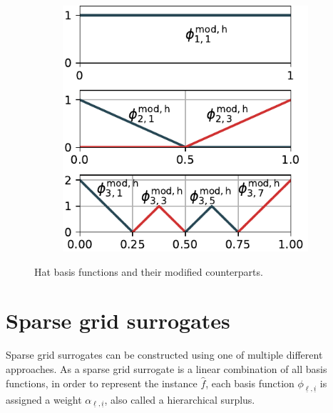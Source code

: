 \documentclass[
  a4paper,  %
  twoside,  %
  bibliography=totoc,
  headsepline,
  cleardoublepage=empty,
  parskip=half,
  draft=false
]{scrbook}
\begin{document}
\begin{mdframed}[style=style]
\begin{figure}[H]
\begin{subfigure}{.5\textwidth}
  \includegraphics[width=\linewidth]{graphics/basis_mod}
  \label{fig:basis_hat_mod}
\vspace{1.5mm}
\end{subfigure}
  \delimit
\caption{Hat basis functions and their modified counterparts.}
  \label{fig:basis_hat}
\end{figure}
\end{mdframed}

\section{Sparse grid surrogates}
\label{sec:gsc}

Sparse grid surrogates can be constructed using one of multiple different approaches.
As a sparse grid surrogate is a linear combination of all basis functions, in order to represent the instance $\hat{f}$, each basis function $\phi_{\underline{\ell},\underline{i}}$ is assigned a weight $\alpha_{\underline{\ell},\underline{i}}$, also called a hierarchical surplus.
\end{document}
